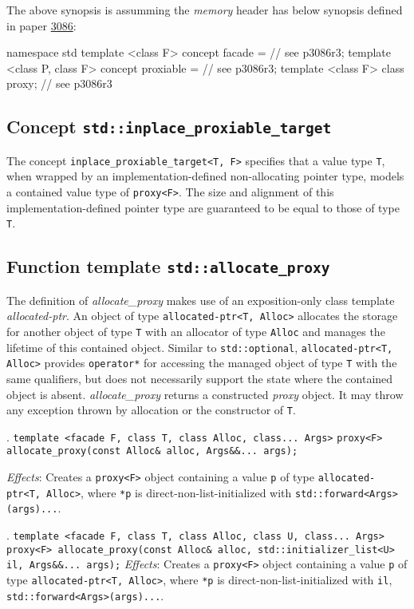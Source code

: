 \documentclass[10pt, a4paper, oneside]{article}
\begin{document}
\noindent The above synopsis is assumming the \textit{memory} header has below synopsis defined in paper \href{https://wg21.link/p3086}{3086}:
\begin{codeblock}
namespace std {
  template <class F>
    concept facade = // see p3086r3;
  template <class P, class F>
    concept proxiable = // see p3086r3;
  template <class F>
    class proxy; // see p3086r3
}

\end{codeblock}

\subsection{Concept \texttt{std::inplace\_proxiable\_target}}
The concept \verb|inplace_proxiable_target<T, F>| specifies that a value type \verb|T|,
when wrapped by an implementation\hyp{}defined non\hyp{}allocating pointer type,
models a contained value type of \verb|proxy<F>|.
The size and alignment of this implementation-defined pointer type are guaranteed to be equal to those of type \verb|T|.

\subsection{Function template \texttt{std::allocate\_proxy}}
The definition of \textit{allocate\_proxy} makes use of an exposition-only class template \textit{allocated-ptr}.
An object of type \verb|allocated-ptr<T, Alloc>| allocates the storage for another object of type \verb|T| with an allocator of type \verb|Alloc| and manages the lifetime of this contained object.
Similar to \verb|std::optional|, \verb|allocated-ptr<T, Alloc>| provides \verb|operator*| for accessing the managed object of type \verb|T| with the same qualifiers,
but does not necessarily support the state where the contained object is absent.\smallbreak
\textit{allocate\_proxy} returns a constructed \textit{proxy} object. It may throw any exception thrown by allocation or the constructor of \verb|T|.
\medbreak

. \verb|template <facade F, class T, class Alloc, class... Args>|\smallbreak
\verb|proxy<F> allocate_proxy(const Alloc& alloc, Args&&... args);|

\textit{Effects}: Creates a \verb|proxy<F>| object containing a value \verb|p| of type \verb|allocated-ptr<T, Alloc>|,
where \verb|*p| is direct-non-list-initialized with \verb|std::forward<Args>(args)...|.
\medbreak

. \verb|template <facade F, class T, class Alloc, class U, class... Args>|\smallbreak
\verb|proxy<F> allocate_proxy(const Alloc& alloc, std::initializer_list<U> il, Args&&... args);|
\medbreak
\textit{Effects}: Creates a \verb|proxy<F>| object containing a value \verb|p| of type \verb|allocated-ptr<T, Alloc>|,
where \verb|*p| is direct-non-list-initialized with \verb|il|, \verb|std::forward<Args>(args)...|.
\medbreak
\end{document}
